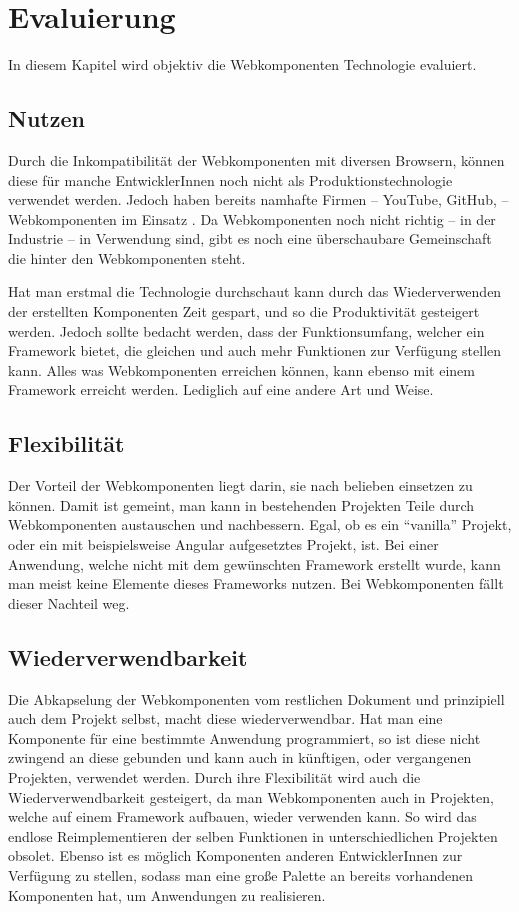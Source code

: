\chapter{Evaluierung}
In diesem Kapitel wird objektiv die Webkomponenten Technologie evaluiert.

\section{Nutzen}
Durch die Inkompatibilität der Webkomponenten mit diversen Browsern, können diese für manche EntwicklerInnen noch nicht als Produktionstechnologie verwendet werden. Jedoch haben bereits namhafte Firmen -- YouTube, GitHub, \etc -- Webkomponenten im Einsatz \cite{webcomponents-production-use}. 
Da Webkomponenten noch nicht richtig -- in der Industrie -- in Verwendung sind, gibt es noch eine überschaubare Gemeinschaft die hinter den Webkomponenten steht. 

Hat man erstmal die Technologie durchschaut kann durch das Wiederverwenden der erstellten Komponenten Zeit gespart, und so die Produktivität gesteigert werden. Jedoch sollte bedacht werden, dass der Funktionsumfang, welcher ein Framework bietet, die gleichen und auch mehr Funktionen zur Verfügung stellen kann. Alles was Webkomponenten erreichen können, kann ebenso mit einem Framework erreicht werden. Lediglich auf eine andere Art und Weise. 

\section{Flexibilität}
Der Vorteil der Webkomponenten liegt darin, sie nach belieben einsetzen zu können. Damit ist gemeint, man kann in bestehenden Projekten Teile durch Webkomponenten austauschen und nachbessern. Egal, ob es ein "`vanilla"' Projekt, oder ein mit beispielsweise Angular aufgesetztes Projekt, ist. Bei einer Anwendung, welche nicht mit dem gewünschten Framework erstellt wurde, kann man meist keine Elemente dieses Frameworks nutzen. Bei Webkomponenten fällt dieser Nachteil weg.

\section{Wiederverwendbarkeit}

Die Abkapselung der Webkomponenten vom restlichen Dokument und prinzipiell auch dem Projekt selbst, macht diese wiederverwendbar. Hat man eine Komponente für eine  bestimmte Anwendung programmiert, so ist diese nicht zwingend an diese gebunden und kann auch in künftigen, oder vergangenen Projekten, verwendet werden. Durch ihre Flexibilität wird auch die Wiederverwendbarkeit gesteigert, da man Webkomponenten auch in Projekten, welche auf einem Framework aufbauen, wieder verwenden kann. So wird das endlose Reimplementieren der selben Funktionen in unterschiedlichen Projekten obsolet. Ebenso ist es möglich Komponenten anderen EntwicklerInnen zur Verfügung zu stellen, sodass man eine große Palette an bereits vorhandenen Komponenten hat, um Anwendungen zu realisieren.

